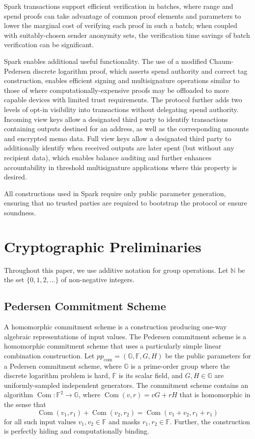 \documentclass{llncs}
\newcommand{\G}{\mathbb{G}}
\newcommand{\F}{\mathbb{F}}
\newcommand{\com}{\operatorname{Com}}
\begin{document}
Spark transactions support efficient verification in batches, where range and spend proofs can take advantage of common proof elements and parameters to lower the marginal cost of verifying each proof in such a batch; when coupled with suitably-chosen sender anonymity sets, the verification time savings of batch verification can be significant.

Spark enables additional useful functionality.
The use of a modified Chaum-Pedersen discrete logarithm proof, which asserts spend authority and correct tag construction, enables efficient signing and multisignature operations similar to those of \cite{musig} where computationally-expensive proofs may be offloaded to more capable devices with limited trust requirements.
The protocol further adds two levels of opt-in visibility into transactions without delegating spend authority.
Incoming view keys allow a designated third party to identify transactions containing outputs destined for an address, as well as the corresponding amounts and encrypted memo data.
Full view keys allow a designated third party to additionally identify when received outputs are later spent (but without any recipient data), which enables balance auditing and further enhances accountability in threshold multisignature applications where this property is desired.

All constructions used in Spark require only public parameter generation, ensuring that no trusted parties are required to bootstrap the protocol or ensure soundness.


\section {Cryptographic Preliminaries}

Throughout this paper, we use additive notation for group operations.
Let $\mathbb{N}$ be the set $\{0,1,2,\ldots\}$ of non-negative integers.


\subsection{Pedersen Commitment Scheme}

A homomorphic commitment scheme is a construction producing one-way algebraic representations of input values.
The Pedersen commitment scheme is a homomorphic commitment scheme that uses a particularly simple linear combination construction.
Let $pp_{\text{com}} = (\G, \F, G, H)$ be the public parameters for a Pedersen commitment scheme, where $\G$ is a prime-order group where the discrete logarithm problem is hard, $\F$ is its scalar field, and $G,H \in \G$ are uniformly-sampled independent generators.
The commitment scheme contains an algorithm $\com: \F^2 \to \G$, where $\com(v,r) = vG + rH$ that is homomorphic in the sense that $$\com(v_1,r_1) + \com(v_2,r_2) = \com(v_1 + v_2,r_1 + r_1)$$ for all such input values $v_1,v_2 \in \F$ and masks $r_1,r_2 \in \F$.
Further, the construction is perfectly hiding and computationally binding.
\end{document}
